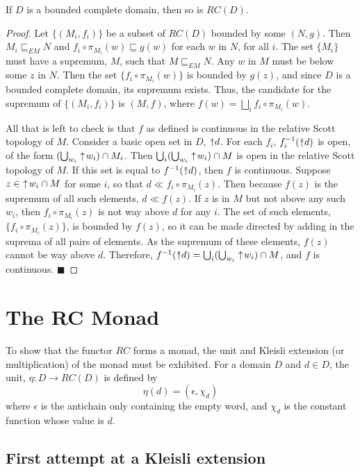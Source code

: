 \begin{theorem}
If $D$ is a bounded complete domain, then so is $RC(D)$.
\end{theorem}
\begin{proof}
Let $\{(M_i,f_i)\}$ be a subset of $RC(D)$ bounded by some $(N,g)$.  Then $M_i\sqsubseteq_{EM} N$ and $f_i\circ \pi_{M_i}(w) \sqsubseteq g(w)$ for each $w$ in $N$, for all $i$.  The set $\{M_i\}$ must have a supremum, $M$, such that $M \sqsubseteq_{EM} N$.  Any $w$ in $M$ must be below some $z$ in $N$.  Then the set $\{f_i \circ \pi_{M_i}(w)\}$ is bounded by $g(z)$, and since $D$ is a bounded complete domain, its supremum exists.  Thus, the candidate for the supremum of $\{(M_i,f_i)\}$ is $(M,f)$, where $f(w) = \bigsqcup_{i} f_i\circ \pi_{M_i}(w)$.  

All that is left to check is that $f$ as defined is continuous in the relative Scott topology of $M$.  Consider a basic open set in $D$, $\Ua d$.  For each $f_i$, $f_i^{-1}(\Ua d)$ is open, of the form $(\bigcup_{w_i}\! \,\uparrow\! w_i) \cap M_i$.  Then $\bigcup_{i} (\bigcup_{w_i}\! \,\uparrow\! w_i) \cap M$ is open in the relative Scott topology of $M$.  If this set is equal to $f^{-1}(\Ua d)$, then $f$ is continuous.  Suppose $z \in\, \,\uparrow\! w_i \cap M$ for some $i$, so that $d \ll f_i\circ \pi_{M_i}(z)$.  Then because $f(z)$ is the supremum of all such elements, $d \ll f(z)$.  If $z$ is in $M$ but not above any such $w_i$, then $f_i\circ \pi_{M_i}(z)$ is not way above $d$ for any $i$.  The set of such elements, $\{f_i\circ \pi_{M_i}(z)\}$, is bounded by $f(z)$, so it can be made directed by adding in the suprema of all pairs of elements.  As the supremum of these elements, $f(z)$ cannot be way above $d$.  Therefore, $f^{-1}(\Ua d) = \bigcup_{i} (\bigcup_{w_i}\! \ua w_i) \cap M$, and $f$ is continuous.
\hfill $\blacksquare$
\end{proof}

\section{The RC Monad}

\medskip
To show that the functor $RC$ forms a monad, the unit and Kleisli extension (or multiplication) of the monad must be exhibited.  For a domain $D$ and $d\in D$, the unit, $\eta:D\rightarrow RC(D)$ is defined by 
\[\eta(d) = (\epsilon, \chi_d)\]
where $\epsilon$ is the antichain only containing the empty word, and $\chi_d$ is the constant function whose value is $d$.

\subsection{First attempt at a Kleisli extension}

